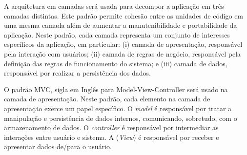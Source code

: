 A arquitetura em camadas será usada para decompor a aplicação em três camadas distintas. Este padrão permite cohesão entre as unidades de código em uma mesma camada além de aumentar a manutenibilidade e portabilidade da aplicação. Neste padrão, cada camada representa um conjunto de interesses específicos da aplicação, em particular: (i) camada de apresentação, responsável pela interação com usuários; (ii) camada de regras de negócio, responsável pela definição das regras de funcionamento do sistema; e (iii) camada de dados, responsável por realizar a persistência dos dados.

O padrão MVC, sigla em Inglês para Model-View-Controller será usado na camada de apresentação. Neste padrão, cada elemento na camada de apresentação exerce um papel específico. O \textit{model} é responsável por tratar a manipulação e persistência de dados internos, comunicando, sobretudo, com o armazenamento de dados. O \textit{controller} é responsável por intermediar as interações entre usuário e sistema. A (\textit{View}) é responsável por receber e apresentar dados de/para o usuário. 







